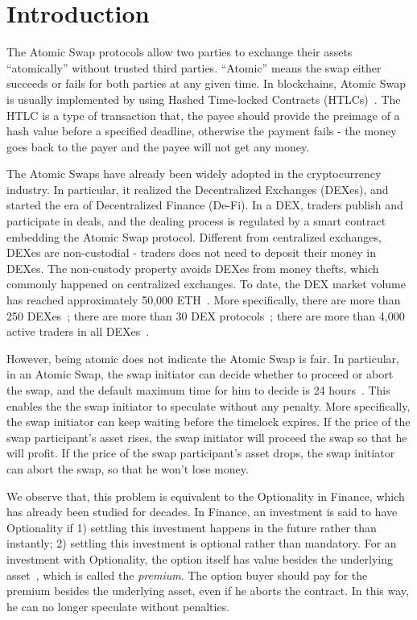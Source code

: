 \section{Introduction}
\label{sec:intro}

The Atomic Swap protocols allow two parties to exchange their assets ``atomically'' without trusted third parties.
``Atomic'' means the swap either succeeds or fails for both parties at any given time.
In blockchains, Atomic Swap is usually implemented by using Hashed Time-locked Contracts (HTLCs)~\cite{poon2016bitcoin}.
The HTLC is a type of transaction that, the payee should provide the preimage of a hash value before a specified deadline, otherwise the payment fails - the money goes back to the payer and the payee will not get any money.

The Atomic Swaps have already been widely adopted in the cryptocurrency industry.
In particular, it realized the Decentralized Exchanges (DEXes), and started the era of Decentralized Finance (De-Fi).
In a DEX, traders publish and participate in deals, and the dealing process is regulated by a smart contract embedding the Atomic Swap protocol.
Different from centralized exchanges, DEXes are non-custodial - traders does not need to deposit their money in DEXes.
The non-custody property avoids DEXes from money thefts, which commonly happened on centralized exchanges.
To date, the DEX market volume has reached approximately 50,000 ETH~\cite{dexwatch}.
More specifically,
there are more than 250 DEXes~\cite{distribuyed/index};
there are more than 30 DEX protocols~\cite{evbots/dex-protocols};
there are more than 4,000 active traders in all DEXes~\cite{dexwatch}.



However, being atomic does not indicate the Atomic Swap is fair.
In particular, in an Atomic Swap, the swap initiator can decide whether to proceed or abort the swap, and the default maximum time for him to decide is 24 hours~\cite{nolan2013alt}.
This enables the the swap initiator to speculate without any penalty.
More specifically, the swap initiator can keep waiting before the timelock expires.
If the price of the swap participant's asset rises, the swap initiator will proceed the swap so that he will profit.
If the price of the swap participant's asset drops, the swap initiator can abort the swap, so that he won't lose money.

We observe that, this problem is equivalent to the Optionality in Finance, which has already been studied for decades.
In Finance, an investment is said to have Optionality if
1) settling this investment happens in the future rather than instantly;
2) settling this investment is optional rather than mandatory.
For an investment with Optionality, the option itself has value besides the underlying asset~\cite{higham2004introduction}, which is called the \textit{premium}.
The option buyer should pay for the premium besides the underlying asset, even if he aborts the contract.
In this way, he can no longer speculate without penalties.

